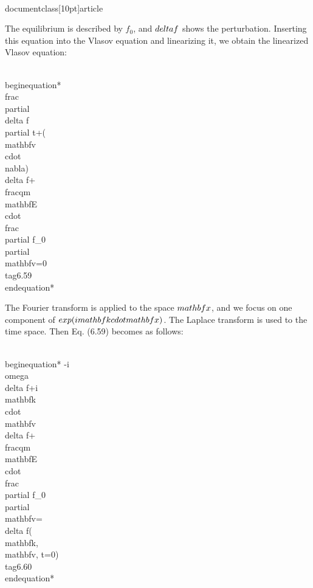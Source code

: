 \\documentclass[10pt]{article}
\begin{document}
{{{{The equilibrium is described by $f_{0}$, and $\\delta f$ shows the perturbation. Inserting this equation into the Vlasov equation and linearizing it, we obtain the linearized Vlasov equation:


\\begin{equation*}
\\frac{\\partial \\delta f}{\\partial t}+(\\mathbf{v} \\cdot \\nabla) \\delta f+\\frac{q}{m} \\mathbf{E} \\cdot \\frac{\\partial f_{0}}{\\partial \\mathbf{v}}=0 \\tag{6.59}
\\end{equation*}


The Fourier transform is applied to the space $\\mathbf{x}$, and we focus on one component of $\\exp (i \\mathbf{k} \\cdot \\mathbf{x})$. The Laplace transform is used to the time space. Then Eq. (6.59) becomes as follows:


\\begin{equation*}
-i \\omega \\delta f+i \\mathbf{k} \\cdot \\mathbf{v} \\delta f+\\frac{q}{m} \\mathbf{E} \\cdot \\frac{\\partial f_{0}}{\\partial \\mathbf{v}}=\\delta f(\\mathbf{k}, \\mathbf{v}, t=0) \\tag{6.60}
\\end{equation*}


}}}}
\end{document}
